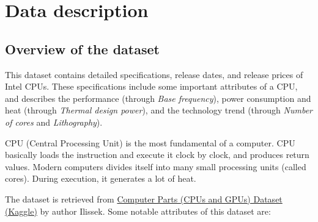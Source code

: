 %
%   
\clearpage
\section{Data description}









\subsection{Overview of the dataset}

This dataset contains detailed specifications, release dates, and release prices of Intel CPUs. These specifications include some important attributes of a CPU,
and describes the performance (through \textit{Base frequency}), power consumption and heat (through \textit{Thermal design power}), and the technology trend (through
\textit{Number of cores} and \textit{Lithography}).

CPU (Central Processing Unit) is the most fundamental of a computer. CPU basically loads the instruction and execute it clock by clock, and produces return values.
Modern computers divides itself into many small processing units (called cores). During execution, it generates a lot of heat.

The dataset is retrieved from \href{https://www.kaggle.com/datasets/iliassekkaf/computerparts?select=Intel_CPUs.csv}{Computer Parts (CPUs and GPUs) Dataset (Kaggle)} 
by author Ilissek. Some notable attributes of this dataset are:

